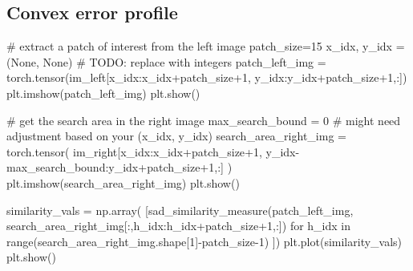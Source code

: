\documentclass[
  letterpaper,
  DIV=11,
  numbers=noendperiod]{scrartcl}
\newenvironment{Shaded}{\begin{snugshade}}{\end{snugshade}}
\newcommand{\AlertTok}[1]{\textcolor[rgb]{0.68,0.00,0.00}{#1}}
\newcommand{\BuiltInTok}[1]{\textcolor[rgb]{0.00,0.23,0.31}{#1}}
\newcommand{\CommentTok}[1]{\textcolor[rgb]{0.37,0.37,0.37}{#1}}
\newcommand{\ControlFlowTok}[1]{\textcolor[rgb]{0.00,0.23,0.31}{#1}}
\newcommand{\DecValTok}[1]{\textcolor[rgb]{0.68,0.00,0.00}{#1}}
\newcommand{\KeywordTok}[1]{\textcolor[rgb]{0.00,0.23,0.31}{#1}}
\newcommand{\NormalTok}[1]{\textcolor[rgb]{0.00,0.23,0.31}{#1}}
\newcommand{\OperatorTok}[1]{\textcolor[rgb]{0.37,0.37,0.37}{#1}}
\newcommand{\VariableTok}[1]{\textcolor[rgb]{0.07,0.07,0.07}{#1}}
\begin{document}
\hypertarget{convex-error-profile}{%
\subsection{Convex error profile}\label{convex-error-profile}}

\begin{Shaded}
\begin{Highlighting}[]
\CommentTok{\# extract a patch of interest from the left image}
\NormalTok{patch\_size}\OperatorTok{=}\DecValTok{15}
\NormalTok{x\_idx, y\_idx }\OperatorTok{=}\NormalTok{ (}\VariableTok{None}\NormalTok{, }\VariableTok{None}\NormalTok{) }\CommentTok{\# }\AlertTok{TODO}\CommentTok{: replace with integers}
\NormalTok{patch\_left\_img }\OperatorTok{=}\NormalTok{ torch.tensor(im\_left[x\_idx:x\_idx}\OperatorTok{+}\NormalTok{patch\_size}\OperatorTok{+}\DecValTok{1}\NormalTok{, y\_idx:y\_idx}\OperatorTok{+}\NormalTok{patch\_size}\OperatorTok{+}\DecValTok{1}\NormalTok{,:])}
\NormalTok{plt.imshow(patch\_left\_img)}
\NormalTok{plt.show()}
\end{Highlighting}
\end{Shaded}

\begin{Shaded}
\begin{Highlighting}[]
\CommentTok{\# get the search area in the right image}
\NormalTok{max\_search\_bound }\OperatorTok{=} \DecValTok{0} \CommentTok{\# might need adjustment based on your (x\_idx, y\_idx)}
\NormalTok{search\_area\_right\_img }\OperatorTok{=}\NormalTok{ torch.tensor(}
\NormalTok{  im\_right[x\_idx:x\_idx}\OperatorTok{+}\NormalTok{patch\_size}\OperatorTok{+}\DecValTok{1}\NormalTok{, y\_idx}\OperatorTok{{-}}\NormalTok{max\_search\_bound:y\_idx}\OperatorTok{+}\NormalTok{patch\_size}\OperatorTok{+}\DecValTok{1}\NormalTok{,:]}
\NormalTok{)}
\NormalTok{plt.imshow(search\_area\_right\_img)}
\NormalTok{plt.show()}
\end{Highlighting}
\end{Shaded}

\begin{Shaded}
\begin{Highlighting}[]
\NormalTok{similarity\_vals }\OperatorTok{=}\NormalTok{ np.array(}
\NormalTok{  [sad\_similarity\_measure(patch\_left\_img, search\_area\_right\_img[:,h\_idx:h\_idx}\OperatorTok{+}\NormalTok{patch\_size}\OperatorTok{+}\DecValTok{1}\NormalTok{,:]) }
   \ControlFlowTok{for}\NormalTok{ h\_idx }\KeywordTok{in} \BuiltInTok{range}\NormalTok{(search\_area\_right\_img.shape[}\DecValTok{1}\NormalTok{]}\OperatorTok{{-}}\NormalTok{patch\_size}\OperatorTok{{-}}\DecValTok{1}\NormalTok{)}
\NormalTok{  ])}
\NormalTok{plt.plot(similarity\_vals)}
\NormalTok{plt.show()}
\end{Highlighting}
\end{Shaded}
\end{document}
